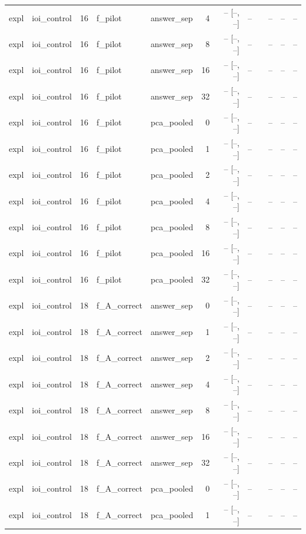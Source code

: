 \begin{tabular}{llrllrrrlrrr}
expl & ioi\_control & 16 & f\_pilot & answer\_sep & 4 & -- [--, --] & -- &  & -- & -- & -- \\
expl & ioi\_control & 16 & f\_pilot & answer\_sep & 8 & -- [--, --] & -- &  & -- & -- & -- \\
expl & ioi\_control & 16 & f\_pilot & answer\_sep & 16 & -- [--, --] & -- &  & -- & -- & -- \\
expl & ioi\_control & 16 & f\_pilot & answer\_sep & 32 & -- [--, --] & -- &  & -- & -- & -- \\
expl & ioi\_control & 16 & f\_pilot & pca\_pooled & 0 & -- [--, --] & -- &  & -- & -- & -- \\
expl & ioi\_control & 16 & f\_pilot & pca\_pooled & 1 & -- [--, --] & -- &  & -- & -- & -- \\
expl & ioi\_control & 16 & f\_pilot & pca\_pooled & 2 & -- [--, --] & -- &  & -- & -- & -- \\
expl & ioi\_control & 16 & f\_pilot & pca\_pooled & 4 & -- [--, --] & -- &  & -- & -- & -- \\
expl & ioi\_control & 16 & f\_pilot & pca\_pooled & 8 & -- [--, --] & -- &  & -- & -- & -- \\
expl & ioi\_control & 16 & f\_pilot & pca\_pooled & 16 & -- [--, --] & -- &  & -- & -- & -- \\
expl & ioi\_control & 16 & f\_pilot & pca\_pooled & 32 & -- [--, --] & -- &  & -- & -- & -- \\
expl & ioi\_control & 18 & f\_A\_correct & answer\_sep & 0 & -- [--, --] & -- &  & -- & -- & -- \\
expl & ioi\_control & 18 & f\_A\_correct & answer\_sep & 1 & -- [--, --] & -- &  & -- & -- & -- \\
expl & ioi\_control & 18 & f\_A\_correct & answer\_sep & 2 & -- [--, --] & -- &  & -- & -- & -- \\
expl & ioi\_control & 18 & f\_A\_correct & answer\_sep & 4 & -- [--, --] & -- &  & -- & -- & -- \\
expl & ioi\_control & 18 & f\_A\_correct & answer\_sep & 8 & -- [--, --] & -- &  & -- & -- & -- \\
expl & ioi\_control & 18 & f\_A\_correct & answer\_sep & 16 & -- [--, --] & -- &  & -- & -- & -- \\
expl & ioi\_control & 18 & f\_A\_correct & answer\_sep & 32 & -- [--, --] & -- &  & -- & -- & -- \\
expl & ioi\_control & 18 & f\_A\_correct & pca\_pooled & 0 & -- [--, --] & -- &  & -- & -- & -- \\
expl & ioi\_control & 18 & f\_A\_correct & pca\_pooled & 1 & -- [--, --] & -- &  & -- & -- & -- \\

\end{tabular}
